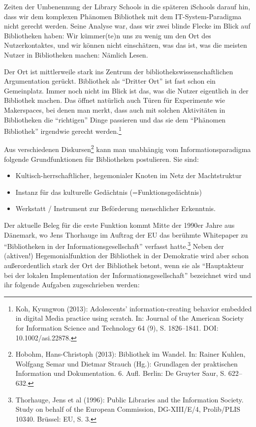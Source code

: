 Zeiten der Umbenennung der Library Schools in die späteren iSchools
darauf hin, dass wir dem komplexen Phänomen Bibliothek mit dem
IT-System-Paradigma nicht gerecht werden. Seine Analyse war, dass wir
zwei blinde Flecke im Blick auf Bibliotheken haben: Wir kümmer(te)n uns
zu wenig um den Ort des Nutzerkontaktes, und wir können nicht
einschätzen, was das ist, was die meisten Nutzer in Bibliotheken machen:
Nämlich Lesen.

Der Ort ist mittlerweile stark ins Zentrum der
bibliothekswissenschaftlichen Argumentation gerückt. Bibliothek als
\enquote{Dritter Ort} ist fast schon ein Gemeinplatz. Immer noch nicht
im Blick ist das, was die Nutzer eigentlich in der Bibliothek machen.
Das öffnet natürlich auch Türen für Experimente wie Makerspaces, bei
denen man merkt, dass auch mit solchen Aktivitäten in Bibliotheken die
\enquote{richtigen} Dinge passieren und das sie dem \enquote{Phänomen
Bibliothek} irgendwie gerecht werden.\footnote{Koh, Kyungwon (2013):
  Adolescents' information-creating behavior embedded in digital Media
  practice using scratch. In: Journal of the American Society for
  Information Science and Technology 64 (9), S. 1826--1841. DOI:
  10.1002/asi.22878.}

Aus verschiedenen Diskursen\footnote{Hobohm, Hans-Christoph (2013):
  Bibliothek im Wandel. In: Rainer Kuhlen, Wolfgang Semar und Dietmar
  Strauch (Hg.): Grundlagen der praktischen Information und
  Dokumentation. 6. Aufl. Berlin: De Gruyter Saur, S. 622--632.} kann
man unabhängig vom Informationsparadigma folgende Grundfunktionen für
Bibliotheken postulieren. Sie sind:

\begin{itemize}
\item
  Kultisch-herrschaftlicher, hegemonialer Knoten im Netz der
  Machtstruktur
\item
  Instanz für das kulturelle Gedächtnis (=Funktionsgedächtnis)
\item
  Werkstatt / Instrument zur Beförderung menschlicher Erkenntnis.
\end{itemize}

Der aktuelle Beleg für die erste Funktion kommt Mitte der 1990er Jahre
aus Dänemark, wo Jens Thorhauge im Auftrag der EU das berühmte
Whitepaper zu \enquote{Bibliotheken in der Informationsgesellschaft}
verfasst hatte.\footnote{Thorhauge, Jens et al (1996): Public Libraries
  and the Information Society. Study on behalf of the European
  Commission, DG-XIII/E/4, Prolib/PLIS 10340. Brüssel: EU, S. 3.} Neben
der (aktiven!) Hegemonialfunktion der Bibliothek in der Demokratie wird
aber schon außerordentlich stark der Ort der Bibliothek betont, wenn sie
als \enquote{Hauptakteur bei der lokalen Implementation der
Informationsgesellschaft} bezeichnet wird und ihr folgende Aufgaben
zugeschrieben werden:

